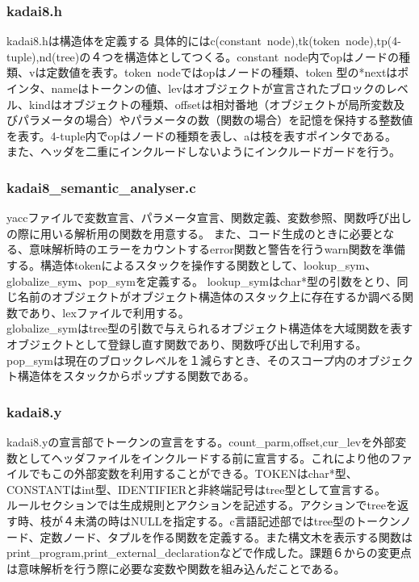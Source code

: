 \documentclass[a4paper,12pt]{jarticle}
\begin{document}
\subsubsection{kadai8.h}
kadai8.hは構造体を定義する
具体的にはc(constant\ node),tk(token\ node),tp(4-tuple),nd(tree)の４つを構造体としてつくる。constant\ node内でopはノードの種類、vは定数値を表す。token\ nodeではopはノードの種類、token 型の*nextはポインタ、nameはトークンの値、levはオブジェクトが宣言されたブロックのレベル、kindはオブジェクトの種類、offsetは相対番地（オブジェクトが局所変数及びパラメータの場合）やパラメータの数（関数の場合）を記憶を保持する整数値を表す。4-tuple内でopはノードの種類を表し、aは枝を表すポインタである。\\
また、ヘッダを二重にインクルードしないようにインクルードガードを行う。



\subsubsection{kadai8\_semantic\_analyser.c}
yaccファイルで変数宣言、パラメータ宣言、関数定義、変数参照、関数呼び出しの際に用いる解析用の関数を用意する。
また、コード生成のときに必要となる、意味解析時のエラーをカウントするerror関数と警告を行うwarn関数を準備する。構造体tokenによるスタックを操作する関数として、lookup\_sym、globalize\_sym、pop\_symを定義する。
lookup\_symはchar*型の引数をとり、同じ名前のオブジェクトがオブジェクト構造体のスタック上に存在するか調べる関数であり、lexファイルで利用する。\\
globalize\_symはtree型の引数で与えられるオブジェクト構造体を大域関数を表すオブジェクトとして登録し直す関数であり、関数呼び出しで利用する。\\
pop\_symは現在のブロックレベルを１減らすとき、そのスコープ内のオブジェクト構造体をスタックからポップする関数である。\\
\subsubsection{kadai8.y}
kadai8.yの宣言部でトークンの宣言をする。count\_parm,offset,cur\_levを外部変数としてヘッダファイルをインクルードする前に宣言する。これにより他のファイルでもこの外部変数を利用することができる。TOKENはchar*型、CONSTANTはint型、IDENTIFIERと非終端記号はtree型として宣言する。\\
ルールセクションでは生成規則とアクションを記述する。アクションでtreeを返す時、枝が４未満の時はNULLを指定する。c言語記述部ではtree型のトークンノード、定数ノード、タプルを作る関数を定義する。また構文木を表示する関数はprint\_program,print\_external\_declarationなどで作成した。課題６からの変更点は意味解析を行う際に必要な変数や関数を組み込んだことである。\\
\end{document}
